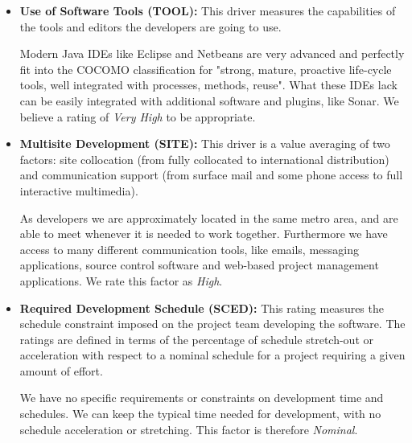 \documentclass[english]{article}
\begin{document}
\begin{itemize}

\item \textbf{Use of Software Tools (TOOL):} This driver measures the capabilities of the tools and editors the developers are going to use.

Modern Java IDEs like Eclipse and Netbeans are very advanced and perfectly fit into the COCOMO classification for "strong, mature, proactive life-cycle tools, well integrated with processes, methods, reuse". What these IDEs lack can be easily integrated with additional software and plugins, like Sonar. We believe a rating of \textit{Very High} to be appropriate.


\item \textbf{Multisite Development (SITE):} This driver is a value averaging of two factors: site collocation (from fully collocated to international distribution) and communication support (from surface mail and some phone access to full interactive multimedia).

As developers we are approximately located in the same metro area, and are able to meet whenever it is needed to work together. Furthermore we have access to many different communication tools, like emails, messaging applications, source control software and web-based project management applications. We rate this factor as \textit{High}.


\item \textbf{Required Development Schedule (SCED):} This rating measures the schedule constraint imposed on the project team developing the software. The ratings are defined in terms of the percentage of schedule stretch-out or acceleration with respect to a nominal schedule for a project requiring a given amount of effort.

We have no specific requirements or constraints on development time and schedules.
We can keep the typical time needed for development, with no schedule acceleration or stretching. This factor is therefore \textit{Nominal}.


\end{itemize}
\end{document}
